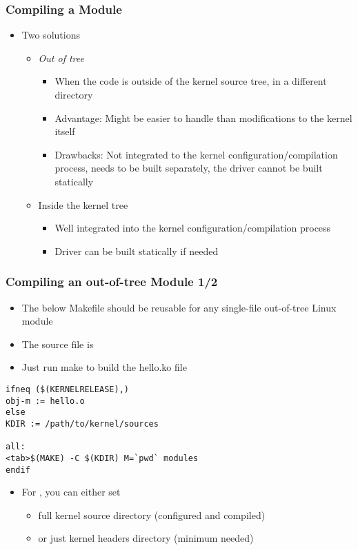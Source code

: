 \begin{frame}
  \frametitle{Compiling a Module}
  \begin{itemize}
  \item Two solutions
    \begin{itemize}
    \item \emph{Out of tree}
      \begin{itemize}
      \item When the code is outside of the kernel source tree, in a
        different directory
      \item Advantage: Might be easier to handle than modifications to
        the kernel itself
      \item Drawbacks: Not integrated to the kernel
        configuration/compilation process, needs to be built
        separately, the driver cannot be built statically
      \end{itemize}
    \item Inside the kernel tree
      \begin{itemize}
      \item Well integrated into the kernel configuration/compilation
        process
      \item Driver can be built statically if needed
      \end{itemize}
    \end{itemize}
  \end{itemize}
\end{frame}

\begin{frame}[fragile]
  \frametitle{Compiling an out-of-tree Module 1/2}
  \begin{itemize}
  \item The below Makefile should be reusable for any single-file
    out-of-tree Linux module
  \item The source file is 
  \item Just run make to build the hello.ko file
  \end{itemize}
\begin{verbatim}
ifneq ($(KERNELRELEASE),)
obj-m := hello.o
else
KDIR := /path/to/kernel/sources

all:
<tab>$(MAKE) -C $(KDIR) M=`pwd` modules
endif
\end{verbatim}

\begin{itemize}
\item For , you can either set
  \begin{itemize}
  \item full kernel source directory (configured and compiled)
  \item or just kernel headers directory (minimum needed)
  \end{itemize}
\end{itemize}
\end{frame}

